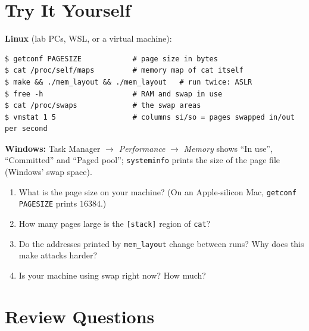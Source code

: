 \documentclass[11pt,a4paper]{article}
\newcommand{\cmd}[1]{\texttt{#1}}
\begin{document}
\section{Try It Yourself}

\begin{tryit}
\textbf{Linux} (lab PCs, WSL, or a virtual machine):
\begin{lstlisting}[style=term]
$ getconf PAGESIZE            # page size in bytes
$ cat /proc/self/maps         # memory map of cat itself
$ make && ./mem_layout && ./mem_layout   # run twice: ASLR
$ free -h                     # RAM and swap in use
$ cat /proc/swaps             # the swap areas
$ vmstat 1 5                  # columns si/so = pages swapped in/out per second
\end{lstlisting}
\textbf{Windows:} Task Manager $\to$ \emph{Performance} $\to$ \emph{Memory} shows ``In use'', ``Committed'' and ``Paged pool''; \cmd{systeminfo} prints the size of the page file (Windows' swap space).
\begin{enumerate}[leftmargin=1.4em]
  \item What is the page size on your machine? (On an Apple-silicon Mac, \cmd{getconf PAGESIZE} prints $16384$.)
  \item How many pages large is the \texttt{[stack]} region of \cmd{cat}?
  \item Do the addresses printed by \cmd{mem\_layout} change between runs? Why does this make attacks harder?
  \item Is your machine using swap right now? How much?
\end{enumerate}
\end{tryit}

\section{Review Questions}
\end{document}
